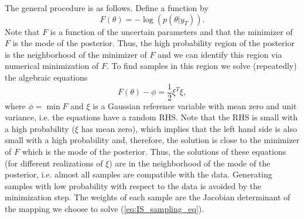 \documentclass[11pt]{article}
\newcommand{\MarginPar}[1]{\marginpar{%
\vskip-\baselineskip %
\raggedright\tiny\sffamily
\hrule\smallskip{\color{red}#1}\par\smallskip\hrule}}
\begin{document}
The general procedure is as follows. Define a function by
\begin{equation}
	F(\theta)= -\log \left(p(\theta|y_T)\right).
\end{equation}
Note that $F$ is a function of the uncertain parameters and that the minimizer of $F$ is the mode of the posterior. Thus, the high probability region of the posterior is the neighborhood of the minimizer of $F$ and we can identify this region via numerical minimization of $F$. To find samples in this region we solve (repeatedly) the algebraic equations
\begin{equation}
\label{eq:IS_sampling_eq}
	F(\theta)-\phi = \frac{1}{2}\xi^T\xi,
\end{equation}
where $\phi = \min F$ and $\xi$ is a Gaussian reference variable with mean zero and unit variance, i.e. the equations have a random RHS.
Note that the RHS is small with a high probability ($\xi$ has mean zero), which implies that the left hand side is also small with a high probability and, therefore, the solution is close to the minimizer of $F$ which is the mode of the posterior.
Thus, the solutions of these equations (for different realizations of $\xi$) are in the neighborhood of the mode of the posterior, i.e. almost all samples are compatible with the data.
Generating samples with low probability with respect to the data is avoided by the minimization step. The weights of each sample are the Jacobian determinant of the mapping we choose to solve (\ref{eq:IS_sampling_eq}).
\end{document}
